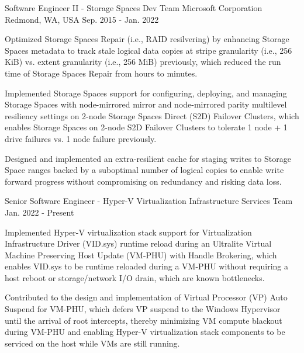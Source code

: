 

\begin{cventries}

  \cventrytwopositions
  {Software Engineer II - Storage Spaces Dev Team} %
  {Microsoft Corporation} %
  {Redmond, WA, USA} %
  {Sep. 2015 - Jan. 2022} %
  {
    \begin{cvitems} %
      \item {
        Optimized Storage Spaces Repair (i.e., RAID resilvering) by enhancing Storage
        Spaces metadata to track stale logical data copies at stripe granularity
        (i.e., 256 KiB) vs. extent granularity (i.e., 256 MiB) previously, which
        reduced the run time of Storage Spaces Repair from hours to minutes.
      }
      \item {
        Implemented Storage Spaces support for configuring, deploying, and managing
        Storage Spaces with node-mirrored mirror and node-mirrored parity multilevel
        resiliency settings on 2-node Storage Spaces Direct (S2D) Failover Clusters,
        which enables Storage Spaces on 2-node S2D Failover Clusters to tolerate 1
        node + 1 drive failures vs. 1 node failure previously.
      }
      \item {
        Designed and implemented an extra-resilient cache for staging writes to
        Storage Space ranges backed by a suboptimal number of logical copies to
        enable write forward progress without compromising on redundancy and risking
        data loss.
      }
    \end{cvitems}
  }
  {Senior Software Engineer - Hyper-V Virtualization Infrastructure Services Team} %
  {Jan. 2022 - Present} %
  {
    \begin{cvitems} %
      \item {
        Implemented Hyper-V virtualization stack support for Virtualization
        Infrastructure Driver (VID.sys) runtime reload during an Ultralite Virtual
        Machine Preserving Host Update (VM-PHU) with Handle Brokering, which enables
        VID.sys to be runtime reloaded during a VM-PHU without requiring a host
        reboot or storage/network I/O drain, which are known bottlenecks.
      }
      \item {
        Contributed to the design and implementation of Virtual Processor (VP) Auto
        Suspend for VM-PHU, which defers VP suspend to the Windows Hypervisor until
        the arrival of root intercepts, thereby minimizing VM compute blackout during
        VM-PHU and enabling Hyper-V virtualization stack components to be serviced
        on the host while VMs are still running.
      }
    \end{cvitems}
  }


\end{cventries}
